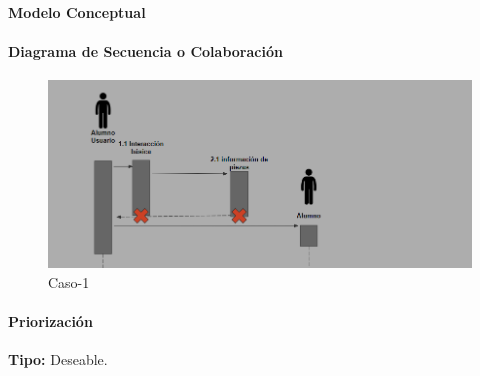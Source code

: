 \paragraph{Modelo Conceptual}


\paragraph{Diagrama de Secuencia o Colaboración}

\begin{figure}[H]
\centerline{\includegraphics[width=15cm]{imgs/CasoUso_4_2.PNG}}
\caption{Caso-1}
\label{fig}
\end{figure}

\paragraph{Priorización}
{\textbf {Tipo:}}
Deseable.